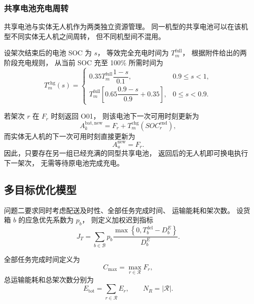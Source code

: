\subsubsection{共享电池充电周转}

共享电池与实体无人机作为两类独立资源管理。
同一机型的共享电池可以在该机型不同实体无人机之间周转，
但不同机型间不混用。

设架次结束后的电池 SOC 为 $s$，
等效完全充电时间为 $T_m^{\mathrm{full}}$，
根据附件给出的两阶段充电规则，
从当前 SOC 充至 100\% 所需时间为
\begin{equation}
	T_m^{\mathrm{chg}}(s)
	=
	\begin{cases}
		0.35T_m^{\mathrm{full}}
		\dfrac{1-s}{0.1},
		&0.9\le s<1,\\[3mm]
		T_m^{\mathrm{full}}
		\left[
		0.65\dfrac{0.9-s}{0.9}
		+0.35
		\right],
		&0\le s<0.9.
	\end{cases}
	\label{eq:q2-charge}
\end{equation}

若架次 $r$ 在 $F_r$ 时刻返回 O01，
则该电池下一次可用时刻更新为
\begin{equation}
	A_k^{\mathrm{bat,new}}
	=
	F_r+T_m^{\mathrm{chg}}
	\left(SOC_r^{\mathrm{end}}\right),
	\label{eq:q2-battery-update}
\end{equation}
而实体无人机的下一次可用时刻直接更新为
\[
A_u^{\mathrm{new}}=F_r.
\]
因此，只要存在另一组已经充满的同型共享电池，
返回后的无人机即可换电执行下一架次，
无需等待原电池完成充电。

\subsection{多目标优化模型}

问题二要求同时考虑配送及时性、全部任务完成时间、
运输能耗和架次数。
设货箱 $b$ 的应急优先系数为 $p_b$，
则定义加权迟到指标
\begin{equation}
	J_T
	=
	\sum_{b\in\mathcal{B}}
	p_b
	\frac{
		\max\left\{0,T_b^{\mathrm{del}}-D_b^{E}\right\}
	}{
		D_b^{E}
	}.
	\label{eq:q2-lateness}
\end{equation}

全部任务完成时间定义为
\begin{equation}
	C_{\max}
	=
	\max_{r\in\mathcal{R}}F_r,
	\label{eq:q2-makespan}
\end{equation}
总运输能耗和总架次数分别为
\begin{equation}
	E_{\mathrm{tot}}
	=
	\sum_{r\in\mathcal{R}}E_r,
	\qquad
	N_R=|\mathcal{R}|.
	\label{eq:q2-energy-trips}
\end{equation}

